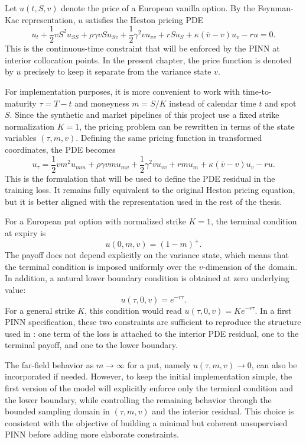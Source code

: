 Let $u(t,S,v)$ denote the price of a European vanilla option. By the Feynman-Kac representation, $u$ satisfies the Heston pricing PDE \cite{heston}
\begin{equation}
u_t
+\frac{1}{2}vS^2u_{SS}
+\rho\gamma vS u_{Sv}
+\frac{1}{2}\gamma^2 v u_{vv}
+rS u_S
+\kappa(\bar v-v)u_v
-ru = 0.
\end{equation}
This is the continuous-time constraint that will be enforced by the PINN at interior collocation points. In the present chapter, the price function is denoted by $u$ precisely to keep it separate from the variance state $v$.

For implementation purposes, it is more convenient to work with time-to-maturity $\tau=T-t$ and moneyness $m=S/K$ instead of calendar time $t$ and spot $S$. Since the synthetic and market pipelines of this project use a fixed strike normalization $K=1$, the pricing problem can be rewritten in terms of the state variables $(\tau,m,v)$. Defining the same pricing function in transformed coordinates, the PDE becomes
\begin{equation}
u_\tau
=\frac{1}{2}vm^2u_{mm}
+\rho\gamma vm u_{mv}
+\frac{1}{2}\gamma^2 v u_{vv}
+rm u_m
+\kappa(\bar v-v)u_v
-ru.
\end{equation}
This is the formulation that will be used to define the PDE residual in the training loss. It remains fully equivalent to the original Heston pricing equation, but it is better aligned with the representation used in the rest of the thesis.

For a European put option with normalized strike $K=1$, the terminal condition at expiry is
\begin{equation}
u(0,m,v) = (1-m)^+.
\end{equation}
The payoff does not depend explicitly on the variance state, which means that the terminal condition is imposed uniformly over the $v$-dimension of the domain. In addition, a natural lower boundary condition is obtained at zero underlying value:
\begin{equation}
u(\tau,0,v)=e^{-r\tau}.
\end{equation}
For a general strike $K$, this condition would read $u(\tau,0,v)=Ke^{-r\tau}$. In a first PINN specification, these two constraints are sufficient to reproduce the structure used in \cite{hainaut2024pinn}: one term of the loss is attached to the interior PDE residual, one to the terminal payoff, and one to the lower boundary.

The far-field behavior as $m\to\infty$ for a put, namely $u(\tau,m,v)\to 0$, can also be incorporated if needed. However, to keep the initial implementation simple, the first version of the model will explicitly enforce only the terminal condition and the lower boundary, while controlling the remaining behavior through the bounded sampling domain in $(\tau,m,v)$ and the interior residual. This choice is consistent with the objective of building a minimal but coherent unsupervised PINN before adding more elaborate constraints.



